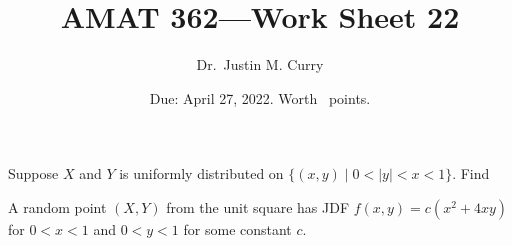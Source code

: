 \documentclass[addpoints,12pt]{exam}
\title{\vspace{-1in} AMAT 362---Work Sheet 22}
\date{Due: April 27, 2022. Worth \numpoints\ points.}
\author{Dr.~Justin M. Curry}
\begin{document}
\maketitle





\begin{questions}

\question[4] Suppose $X$ and $Y$ is uniformly distributed on $\{(x,y) \mid 0 < |y| < x < 1\}$. Find

\noaddpoints
{}
\addpoints

\newpage
\question[3] A random point $(X,Y)$ from the unit square has JDF $f(x,y)=c(x^2+4xy)$ for $0<x<1$ and $0<y<1$ for some constant $c$.

\noaddpoints
\begin{parts}


\end{parts}
\end{questions}
\end{document}
